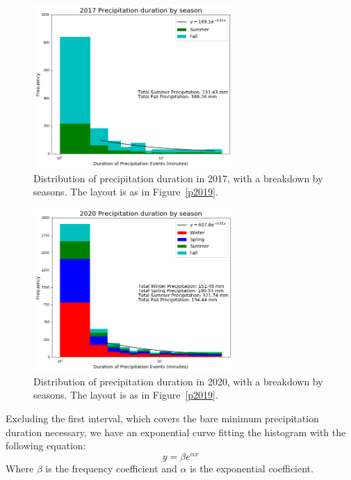 \documentclass[11pt]{report}
\begin{document}
\clearpage
\begin{figure}[t]
	\centering
	\includegraphics[width=0.675\textwidth]{Figures/precip_2017.png}
	\caption[Precipitation histogram for 2017 broken down by season]{\label{p2017}
		Distribution of precipitation duration in 2017, with a breakdown
		by seasons. The layout is as in Figure~\ref{p2019}.}
\end{figure}
\begin{figure}[b]
	\centering
	\includegraphics[width=0.675\textwidth]{Figures/precip_2020.png}
	\caption[Precipitation histogram for 2020 broken down by season]{\label{p2020}
		Distribution of precipitation duration in 2020, with a breakdown
		by seasons. The layout is as in Figure~\ref{p2019}.}
\end{figure}

\clearpage
Excluding the first interval, which covers the bare minimum precipitation duration necessary, we have an exponential curve fitting the histogram with the following equation: 
\begin{equation}
	y = \beta e^{\alpha x} 
\end{equation}
	Where $\beta$ is the frequency coefficient and $\alpha $ is the exponential coefficient. 
	
\end{document}
